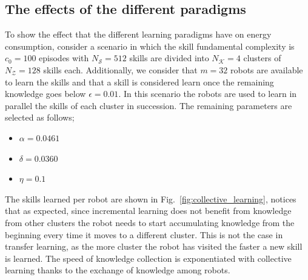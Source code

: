 \subsection{The effects of the different paradigms}
To show the effect that the different learning paradigms have on energy consumption, consider a scenario in which the skill fundamental complexity is $c_0=100$ episodes with $N_\mathcal{S}= 512$  skills are divided into $N_\mathcal{K}=4$ clusters of $N_\mathcal{Z} = 128$ skills each. Additionally, we consider that $m=32$ robots are available to learn the skills and that a skill is considered learn once the remaining knowledge goes below $\epsilon = 0.01$. In this scenario the robots are used to learn in parallel the skills of each cluster in succession. The remaining parameters are selected as follows;
\begin{itemize}
	\item $\alpha =  0.0461$
	\item $\delta =  0.0360$
	\item $\eta= 0.1$
\end{itemize} 
The skills learned per robot are shown in Fig.~\ref{fig:collective_learning}, notices that as expected, since incremental learning does not benefit from knowledge from other clusters the robot needs to start accumulating knowledge from the beginning every time it moves to a different cluster. This is not the case in transfer learning, as the more cluster the robot has visited the faster a new skill is learned. The speed of knowledge collection is exponentiated with collective learning thanks to the exchange of knowledge among robots. 
